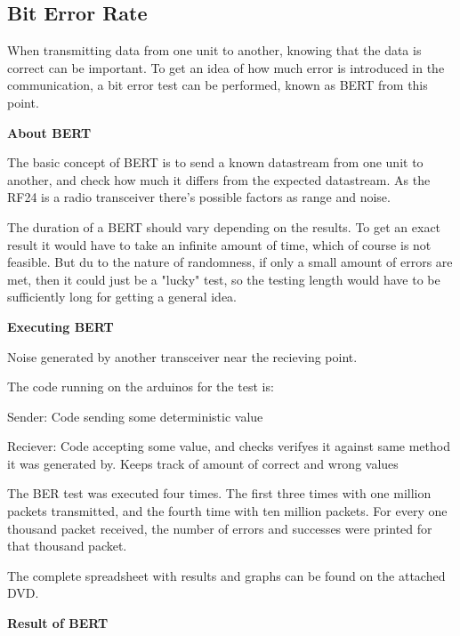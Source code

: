 \subsection{Bit Error Rate}
When transmitting data from one unit to another, knowing that the data is correct can be important. To get an idea of how much error is introduced in the communication, a bit error test can be performed, known as BERT from this point.

\textbf{About BERT}

The basic concept of BERT is to send a known datastream from one unit to another, and check how much it differs from the expected datastream. As the RF24 is a radio transceiver there's possible factors as range and noise. 

The duration of a BERT should vary depending on the results. To get an exact result it would have to take an infinite amount of time, which of course is not feasible. But du to the nature of randomness, if only a small amount of errors are met, then it could just be a "lucky"  test, so the testing length would have to be sufficiently long for getting a general idea.

\textbf{Executing BERT} 

Noise generated by another transceiver near the recieving point.

The code running on the arduinos for the test is:

Sender:
Code sending some deterministic value

Reciever:
Code accepting some value, and checks verifyes it against same method it was generated by.
Keeps track of amount of correct and wrong values

The BER test was executed four times. The first three times with one million packets transmitted, and the fourth time with ten million packets. For every one thousand packet received, the number of errors and successes were printed for that thousand packet. 

The complete spreadsheet with results and graphs can be found on the attached DVD. 

\textbf{Result of BERT}

